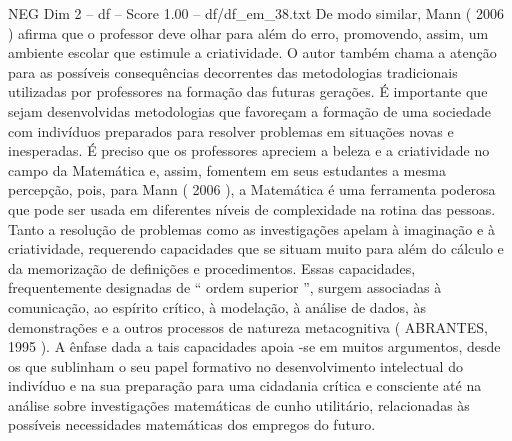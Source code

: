 \begin{textsample}{NEG Dim 2 – df – Score 1.00 – df/df\_em\_38.txt}
De modo similar, Mann ( 2006 ) afirma que o professor deve olhar para além do erro, promovendo, assim, um ambiente escolar que estimule a criatividade.
O autor também chama a atenção para as possíveis consequências decorrentes das metodologias tradicionais utilizadas por professores na formação das futuras gerações.
É importante que sejam desenvolvidas metodologias que favoreçam a formação de uma sociedade com indivíduos preparados para resolver problemas em situações novas e inesperadas.
É preciso que os professores apreciem a beleza e a criatividade no campo da Matemática e, assim, fomentem em seus estudantes a mesma percepção, pois, para Mann ( 2006 ), a Matemática é uma ferramenta poderosa que pode ser usada em diferentes níveis de complexidade na rotina das pessoas.
Tanto a resolução de problemas como as investigações apelam à imaginação e à criatividade, requerendo capacidades que se situam muito para além do cálculo e da memorização de definições e procedimentos.
Essas capacidades, frequentemente designadas de “ ordem superior ”, surgem associadas à comunicação, ao espírito crítico, à modelação, à análise de dados, às demonstrações e a outros processos de natureza metacognitiva ( ABRANTES, 1995 ).
A ênfase dada a tais capacidades apoia -se em muitos argumentos, desde os que sublinham o seu papel formativo no desenvolvimento intelectual do indivíduo e na sua preparação para uma cidadania crítica e consciente até na análise sobre investigações matemáticas de cunho utilitário, relacionadas às possíveis necessidades matemáticas dos empregos do futuro.

\end{textsample}
